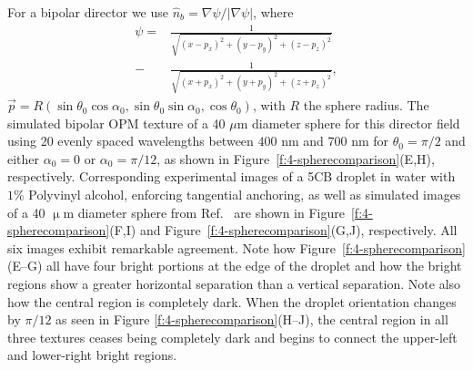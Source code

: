 For a bipolar director we use $\hat{n}_b = \nabla \psi/|\nabla \psi|$, where
\begin{align}
\psi =& \frac{1}{\sqrt{(x-p_x)^2+(y-p_y)^2+(z-p_z)^2}} \nonumber \\
      -& \frac{1}{\sqrt{(x+p_x)^2+(y+p_y)^2+(z+p_z)^2}}, \label{e:4-bipolar_pot}
\end{align}
$\vec{p} = R(\sin \theta_0\cos\alpha_0,\sin \theta_0\sin\alpha_0,\cos\theta_0) $, with $R$ the sphere radius.
The simulated bipolar OPM texture of a 40 $\mu$m diameter sphere for this director field using 20 evenly spaced wavelengths between $400$ nm and $700$ nm for $\theta_0 = \pi/2$ and either $\alpha_0 = 0$ or $\alpha_0 = \pi/12$, as shown in Figure~\ref{f:4-spherecomparison}(E,H), respectively.
Corresponding experimental images of a 5CB droplet in water with $1\%$ Polyvinyl alcohol, enforcing tangential anchoring, as well as simulated images of a 40 $\upmu$m diameter sphere from Ref.~ are shown in Figure~\ref{f:4-spherecomparison}(F,I) and Figure~\ref{f:4-spherecomparison}(G,J), respectively.
All six images exhibit remarkable agreement.
Note how Figure~\ref{f:4-spherecomparison}(E--G) all have four bright portions at the edge of the droplet and how the bright regions show a greater horizontal separation than a vertical separation.
Note also how the central region is completely dark.
When the droplet orientation changes by $\pi/12$ as seen in Figure \ref{f:4-spherecomparison}(H--J), the central region in all three textures ceases being completely dark and begins to connect the upper-left and lower-right bright regions.

